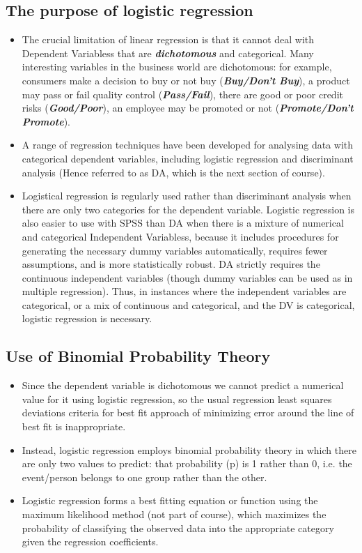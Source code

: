 \documentclass[a4paper,12pt]{article}
\begin{document}
\subsection{The purpose of logistic regression}
\begin{itemize}
	\item The crucial limitation of linear regression is that it cannot deal with Dependent Variabless that are \textbf{\textit{dichotomous}} and categorical. Many interesting variables in the business world are dichotomous: for
	example, consumers make a decision to buy or not buy (\textit{\textbf{Buy/Don't Buy}}), a product may pass or fail quality control (\textit{\textbf{Pass/Fail}}), there are good or poor credit risks (\textit{\textbf{Good/Poor}}), an employee may be promoted or not (\textit{\textbf{Promote/Don't Promote}}).
	
	\item 	A range of regression techniques have been developed for analysing data with categorical dependent
	variables, including logistic regression and discriminant analysis (Hence referred to as DA, which is the next section of course).
	
	\item 	Logistical regression is regularly used rather than discriminant analysis when there are only two categories
	for the dependent variable. Logistic regression is also easier to use with SPSS than DA when
	there is a mixture of numerical and categorical Independent Variabless, because it includes procedures for
	generating the necessary dummy variables automatically, requires fewer assumptions, and
	is more statistically robust. DA strictly requires the continuous independent variables  (though dummy variables can be used as in multiple regression). Thus, in instances where
	the independent variables are categorical, or a mix of continuous and categorical, and the
	DV is categorical, logistic regression is necessary.
\end{itemize}


\subsection{Use of Binomial Probability Theory}
\begin{itemize}
	\item Since the dependent variable is dichotomous we cannot predict a numerical value for it
	using logistic regression, so the usual regression least squares deviations criteria for best fit
	approach of minimizing error around the line of best fit is inappropriate.
	
	\item 	Instead, logistic regression employs binomial probability theory in which there are only two values to
	predict: that probability (p) is 1 rather than 0, i.e. the event/person belongs to one group
	rather than the other.
	\item Logistic regression forms a best fitting equation or function using the
	maximum likelihood method (not part of course), which maximizes the probability of classifying the observed
	data into the appropriate category given the regression coefficients.
\end{itemize}
\end{document}
